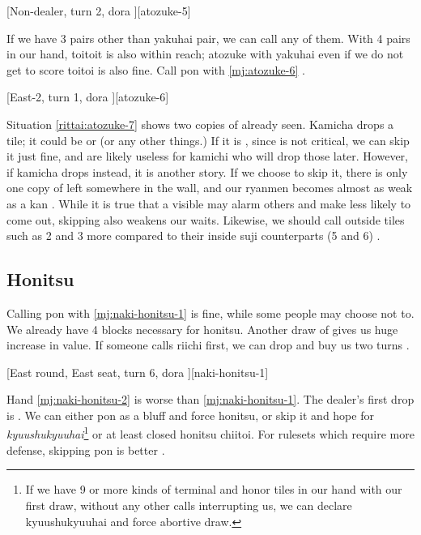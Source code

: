 \documentclass[12pt]{article}
\begin{document}
[Non-dealer, turn 2, dora ][atozuke-5]

If we have 3 pairs other than yakuhai pair, we can call any of them. With 4 pairs in our hand, toitoit is also within reach; atozuke with yakuhai even if we do not get to score toitoi is also fine. Call  pon with \ref{mj:atozuke-6} \citep{yuusee-atozuke}.

[East-2, turn 1, dora ][atozuke-6]

Situation \ref{rittai:atozuke-7} shows two copies of  already seen. Kamicha drops a tile; it could be  or  (or any other things.) If it is , since  is not critical, we can skip it just fine, and  are likely useless for kamichi who will drop those later. However, if kamicha drops  instead, it is another story. If we choose to skip it, there is only one copy of  left somewhere in the wall, and our  ryanmen becomes almost as weak as a kan . While it is true that a visible  may alarm others and make  less likely to come out, skipping  also weakens our waits. Likewise, we should call outside tiles such as 2 and 3 more compared to their inside suji counterparts (5 and 6) \citep[][pp.~131--132]{kawamura-naki}.

\begin{rittai}[h]
  \centering
  \caption{Call kamicha's , but do not call }
  \label{rittai:atozuke-7}
\end{rittai}


\subsection{Honitsu}

Calling  pon with \ref{mj:naki-honitsu-1} is fine, while some people may choose not to. We already have 4 blocks necessary for honitsu. Another draw of  gives us huge increase in value. If someone calls riichi first, we can drop  and buy us two turns \citep[][pp.~112--123, p~217]{fkt}.

[East round, East seat, turn 6, dora ][naki-honitsu-1]

Hand \ref{mj:naki-honitsu-2} is worse than \ref{mj:naki-honitsu-1}. The dealer's first drop is . We can either pon  as a bluff and force honitsu, or skip it and hope for \textit{kyuushukyuuhai}\footnote{If we have 9 or more kinds of terminal and honor tiles in our hand with our first draw, without any other calls interrupting us, we can declare kyuushukyuuhai and force abortive draw.} or at least closed honitsu chiitoi. For rulesets which require more defense, skipping  pon is better \citep[][pp.~124--125, p.~217]{fkt}.
\end{document}
